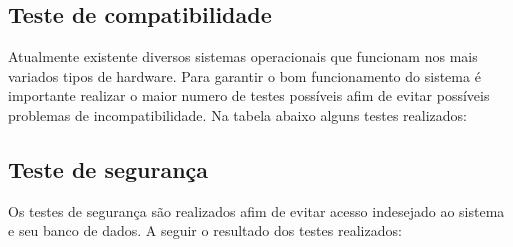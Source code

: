 \subsection{Teste de compatibilidade}
Atualmente existente diversos sistemas operacionais que funcionam nos mais variados tipos de hardware. Para garantir o bom funcionamento do sistema é importante realizar o maior numero de testes possíveis afim de evitar possíveis problemas de incompatibilidade. Na tabela abaixo alguns testes realizados:

\begin{table}[H]
\centering
\caption{Teste compatibilidade}
\label{tab:testeCompatibilidade}
\end{table}

\subsection{Teste de segurança}
Os testes de segurança são realizados afim de evitar acesso indesejado ao sistema e seu banco de dados. A seguir o resultado dos testes realizados: 

